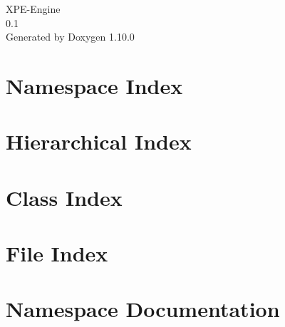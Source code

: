 \documentclass[twoside]{book}
\newcommand{\+}{\discretionary{\mbox{\scriptsize$\hookleftarrow$}}{}{}}
\newcommand{\clearemptydoublepage}{%
    \newpage{\pagestyle{empty}\cleardoublepage}%
  }
\begin{document}
  \raggedbottom
    \hypersetup{pageanchor=false,
                bookmarksnumbered=true,
                pdfencoding=unicode
               }
  \begin{titlepage}
  \vspace*{7cm}
  \begin{center}%
  {\Large XPE-\/\+Engine}\\
  [1ex]\large 0.\+1 \\
  \vspace*{1cm}
  {\large Generated by Doxygen 1.10.0}\\
  \end{center}
  \end{titlepage}
  \clearemptydoublepage
  \tableofcontents
  \clearemptydoublepage
  \hypersetup{pageanchor=true}
\chapter{Namespace Index}

\chapter{Hierarchical Index}

\chapter{Class Index}

\chapter{File Index}

\chapter{Namespace Documentation}













\end{document}
